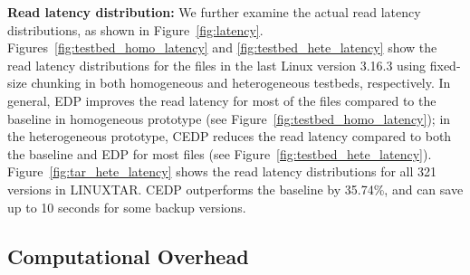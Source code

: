 

{\bf Read latency distribution:} We further examine the actual read latency
distributions, as shown in Figure~\ref{fig:latency}.   
Figures~\ref{fig:testbed_homo_latency} and \ref{fig:testbed_hete_latency} show 
the read latency distributions for the files in the last Linux version 3.16.3
using fixed-size chunking in both homogeneous and heterogeneous testbeds,
respectively.  In general, EDP improves the read latency for most of the files
compared to the baseline in homogeneous prototype (see
Figure~\ref{fig:testbed_homo_latency}); in the heterogeneous prototype, CEDP
reduces the read latency compared to both the baseline and EDP for most files 
(see Figure~\ref{fig:testbed_hete_latency}). 
Figure~\ref{fig:tar_hete_latency} shows the read latency distributions for all
321 versions in LINUXTAR.  CEDP outperforms the baseline by
35.74\%, and can save up to 10 seconds for some backup versions. 

\subsection{Computational Overhead}
\label{subsec:overhead}


